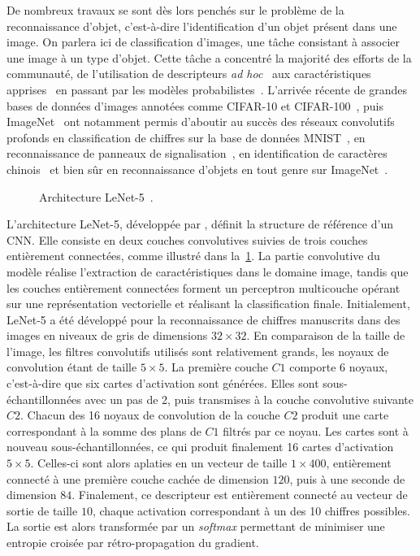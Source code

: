 De nombreux travaux se sont dès lors penchés sur le problème de la reconnaissance d'objet, c'est-à-dire l'identification d'un objet présent dans une image. On parlera ici de classification d'images, une tâche consistant à associer une image à un type d'objet. Cette tâche a concentré la majorité des efforts de la communauté, de l'utilisation de descripteurs \emph{ad hoc}~\cite{ullman_aligning_1989} aux caractéristiques apprises~\cite{vidal-naquet_object_2003} en passant par les modèles probabilistes~\cite{schneiderman_probabilistic_1998}. L'arrivée récente de grandes bases de données d'images annotées comme CIFAR-10 et CIFAR-100~\cite{krizhevsky_learning_2009}, puis ImageNet~\cite{deng_imagenet_2009,russakovsky_imagenet_2015} ont notamment permis d'aboutir au succès des réseaux convolutifs profonds en classification de chiffres sur la base de données MNIST~\cite{lecun_gradient-based_1998}, en reconnaissance de panneaux de signalisation~\cite{stallkamp_german_2011}, en identification de caractères chinois~\cite{liu_icdar_2011} et bien sûr en reconnaissance d'objets en tout genre sur ImageNet~\cite{krizhevsky_imagenet_2012}.

\begin{figure}[t]
  \resizebox{\textwidth}{!}{
    
  }
  \caption[Architecture LeNet-5.]{Architecture LeNet-5~\cite{lecun_gradient-based_1998}.}
  \label{fig:lenet}
\end{figure}

L'architecture LeNet-5, développée par \citet{lecun_gradient-based_1998}, définit la structure de référence d'un \gls{CNN}. Elle consiste en deux couches convolutives suivies de trois couches entièrement connectées, comme illustré dans la~\cref{fig:lenet}. La partie convolutive du modèle réalise l'extraction de caractéristiques dans le domaine image, tandis que les couches entièrement connectées forment un perceptron multicouche opérant sur une représentation vectorielle et réalisant la classification finale. Initialement, LeNet-5 a été développé pour la reconnaissance de chiffres manuscrits dans des images en niveaux de gris de dimensions $32\times32$. En comparaison de la taille de l'image, les filtres convolutifs utilisés sont relativement grands, les noyaux de convolution étant de taille $5\times5$. La première couche $C1$ comporte 6 noyaux, c'est-à-dire que six cartes d'activation sont générées. Elles sont sous-échantillonnées avec un pas de 2, puis transmises à la couche convolutive suivante $C2$. Chacun des 16 noyaux de convolution de la couche $C2$ produit une carte correspondant à la somme des plans de $C1$ filtrés par ce noyau. Les cartes sont à nouveau sous-échantillonnées, ce qui produit finalement 16 cartes d'activation $5\times5$. Celles-ci sont alors aplaties en un vecteur de taille $1\times400$, entièrement connecté à une première couche cachée de dimension $120$, puis à une seconde de dimension $84$.
Finalement, ce descripteur est entièrement connecté au vecteur de sortie de taille $10$, chaque activation correspondant à un des 10 chiffres possibles. La sortie est alors transformée par un \emph{softmax} permettant de minimiser une entropie croisée par rétro-propagation du gradient.

